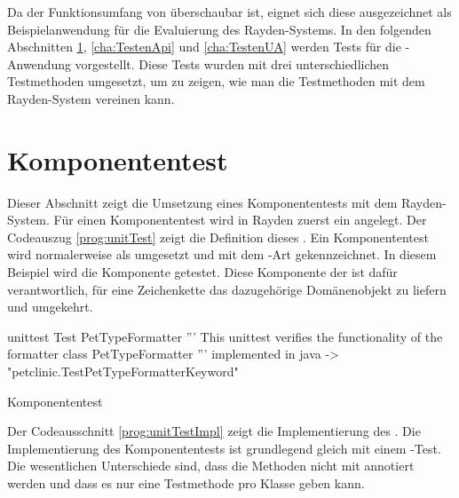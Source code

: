 \SuperPar
Da der Funktionsumfang von  überschaubar ist, eignet sich diese ausgezeichnet als Beispielanwendung für die Evaluierung des Rayden-Systems. In den folgenden Abschnitten \ref{cha:TestenUnit}, \ref{cha:TestenApi} und \ref{cha:TestenUA} werden Tests für die -Anwendung vorgestellt. Diese Tests wurden mit drei unterschiedlichen Testmethoden umgesetzt, um zu zeigen, wie man die Testmethoden mit dem Rayden-System vereinen kann.

\section{Komponententest}
\label{cha:TestenUnit}

Dieser Abschnitt zeigt die Umsetzung eines Komponententests mit dem Rayden-System. Für einen Komponententest wird in Rayden zuerst ein  angelegt. Der Codeauszug \ref{prog:unitTest} zeigt die Definition dieses . Ein Komponententest wird normalerweise als  umgesetzt und mit dem -Art  gekennzeichnet. In diesem Beispiel wird die Komponente  getestet. Diese Komponente der  ist dafür verantwortlich, für eine Zeichenkette das dazugehörige Domänenobjekt zu liefern und umgekehrt. 

\begin{program}
\begin{JavaCode}
unittest Test PetTypeFormatter {
	''' This unittest verifies the functionality of the 
	    formatter class PetTypeFormatter '''
	implemented in java -> "petclinic.TestPetTypeFormatterKeyword"
}
\end{JavaCode}
\caption{Komponententest }
\label{prog:unitTest}
\end{program}

\SuperPar
Der Codeausschnitt \ref{prog:unitTestImpl} zeigt die Implementierung des . Die Implementierung des Komponententests ist grundlegend gleich mit einem -Test. Die wesentlichen Unterschiede sind, dass die Methoden nicht mit  annotiert werden und dass es nur eine Testmethode pro Klasse geben kann. 

